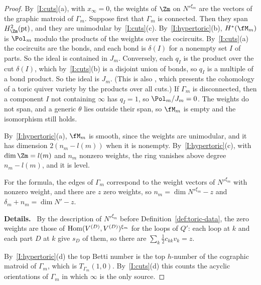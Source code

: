 \documentclass[11pt]{amsart}
\newenvironment{details}{\par\color{black!60!green}\noindent\textbf{Details.}\ }{\par}
\begin{document}
\begin{proof}
By~\ref{I:cuts}(a), with $x_\infty=0$, the weights of $\Zm$ on $N'^{\xi_m}$ are
the vectors of the graphic matroid of $\Gamma_m$.  Suppose first that $\Gamma_m$
is connected.  Then they span $H^2_{\Zm}(\mathrm{pt})$, and they are unimodular
by~\ref{I:cuts}(c).  By~\ref{I:hypertoric}(b), $H^*(\fM_m)$ is $\Pol_m$ modulo the
products of the weights over the cocircuits.  By~\ref{I:cuts}(a) the cocircuits
are the bonds, and each bond is $\delta(I)$ for a nonempty set $I$ of parts.  So
the ideal is contained in $J_m$.  Conversely, each $q_I$ is the product over the
cut $\delta(I)$, which by~\ref{I:cuts}(b) is a disjoint union of bonds, so
$q_I$ is a multiple of a bond product.  So the ideal is $J_m$.  (This is also
\cite[Thm.~8.3]{hauselToricHyperKahler2002}, which presents the cohomology of a
toric quiver variety by the products over all cuts.)  If $\Gamma_m$ is
disconnected, then a component $I$ not containing $\infty$ has $q_I=1$, so
$\Pol_m/J_m=0$.  The weights do not span, and a generic $\theta$ lies outside
their span, so $\fM_m$ is empty and the isomorphism still holds.

By~\ref{I:hypertoric}(a), $\fM_m$ is smooth, since the weights are
unimodular, and it has dimension $2(n_m-l(m))$ when it is nonempty.
By~\ref{I:hypertoric}(c), with $\dim\Zm=l(m)$ and $n_m$ nonzero weights, the
ring vanishes above degree $n_m-l(m)$, and it is level.

For the formula, the edges of $\Gamma_m$ correspond to the weight vectors of
$N'^{\xi_m}$ with nonzero weight, and there are $z$ zero weights, so
$n_m=\dim N'^{\xi_m}-z$ and $\delta_m+n_m=\dim N'-z$.
\begin{details}
By the description of $N'^{\xi_m}$
before Definition~\ref{def:toric-data}, the zero weights are those of
$\operatorname{Hom}(V^{(D)},V^{(D)})^{\xi_m}$ for the loops of $Q'$: each loop at $k$ and
each part $D$ at $k$ give $s_D$ of them, so there are $\sum_k\frac12c_{kk}v_k=z$.
\end{details}
By~\ref{I:hypertoric}(d) the top Betti number
is the top $h$-number of the cographic matroid of $\Gamma_m$, which is
$T_{\Gamma_m}(1,0)$.
By~\ref{I:cuts}(d) this counts the acyclic orientations of $\Gamma_m$ in which
$\infty$ is the only source.
\end{proof}
\end{document}
